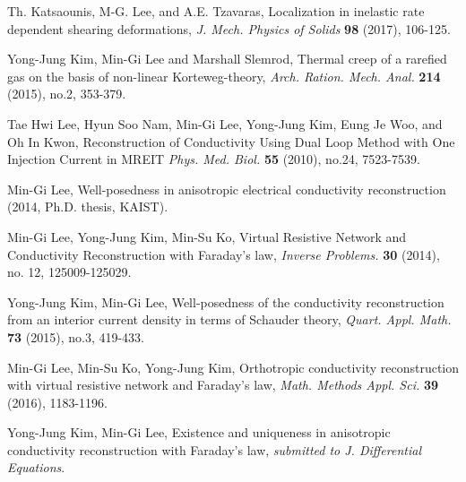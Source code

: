\documentclass[a4paper,11pt]{article}
\begin{document}
\begin{thebibliography}{10}

{\sc Th. Katsaounis, M-G. Lee, and A.E. Tzavaras}, 
Localization in inelastic rate dependent shearing deformations, 
{\em J.  Mech. Physics of Solids} {\bf 98} (2017), 106-125.

Yong-Jung Kim, Min-Gi Lee and Marshall Slemrod, Thermal creep of a rarefied gas on the basis of non-linear Korteweg-theory, {\it Arch. Ration. Mech. Anal.} {\bf 214} (2015), no.2, 353-379.

Tae Hwi Lee, Hyun Soo Nam, Min-Gi Lee, Yong-Jung Kim, Eung Je Woo, and Oh In Kwon, Reconstruction of Conductivity Using Dual Loop Method with One Injection Current in MREIT {\it Phys. Med. Biol.} {\bf 55} (2010), no.24, 7523-7539.

Min-Gi Lee, Well-posedness in anisotropic electrical conductivity reconstruction (2014, Ph.D. thesis, KAIST). %

Min-Gi Lee, Yong-Jung Kim, Min-Su Ko, Virtual Resistive Network and Conductivity Reconstruction with Faraday's law, {\it Inverse Problems.} {\bf 30} (2014), no. 12, 125009-125029.

Yong-Jung Kim, Min-Gi Lee, Well-posedness of the conductivity reconstruction from an interior current density in terms of Schauder theory, {\it Quart. Appl. Math.} {\bf 73} (2015), no.3, 419-433.

Min-Gi Lee, Min-Su Ko, Yong-Jung Kim, Orthotropic conductivity reconstruction with virtual resistive network and Faraday's law, {\it Math. Methods Appl. Sci.} {\bf 39} (2016), 1183-1196.

Yong-Jung Kim, Min-Gi Lee, Existence and uniqueness in anisotropic conductivity reconstruction with Faraday's law, {\it submitted to J. Differential Equations}.








\end{thebibliography}
\end{document}
